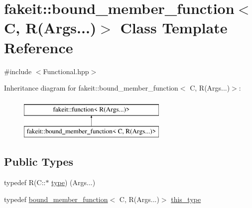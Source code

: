 \hypertarget{classfakeit_1_1bound__member__function_3_01C_00_01R_07Args_8_8_8_08_4}{}\section{fakeit\+::bound\+\_\+member\+\_\+function$<$ C, R(Args...)$>$ Class Template Reference}
\label{classfakeit_1_1bound__member__function_3_01C_00_01R_07Args_8_8_8_08_4}


{\ttfamily \#include $<$Functional.\+hpp$>$}

Inheritance diagram for fakeit\+::bound\+\_\+member\+\_\+function$<$ C, R(Args...)$>$\+:\begin{figure}[H]
\begin{center}
\leavevmode
\includegraphics[height=2.000000cm]{classfakeit_1_1bound__member__function_3_01C_00_01R_07Args_8_8_8_08_4}
\end{center}
\end{figure}
\subsection*{Public Types}
\begin{DoxyCompactItemize}
\item 
typedef R(C\+::$\ast$ \mbox{\hyperlink{classfakeit_1_1bound__member__function_3_01C_00_01R_07Args_8_8_8_08_4_ac79ac3937ebd63418a5873c044c22cf9}{type}}) (Args...)
\item 
typedef \mbox{\hyperlink{classfakeit_1_1bound__member__function}{bound\+\_\+member\+\_\+function}}$<$ C, R(Args...)$>$ \mbox{\hyperlink{classfakeit_1_1bound__member__function_3_01C_00_01R_07Args_8_8_8_08_4_a65c1f42260047efb95028bc0ac5a8f09}{this\+\_\+type}}
\end{DoxyCompactItemize}
